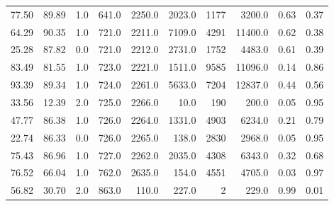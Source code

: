 \begin{table}
\begin{tabular}{rrrrrrrrrr}
77.50 &  89.89 &      1.0 &  641.0 & 2250.0 &  2023.0 &  1177 &  3200.0 & 0.63 & 0.37 \\
64.29 &  90.35 &      1.0 &  721.0 & 2211.0 &  7109.0 &  4291 & 11400.0 & 0.62 & 0.38 \\
25.28 &  87.82 &      0.0 &  721.0 & 2212.0 &  2731.0 &  1752 &  4483.0 & 0.61 & 0.39 \\
83.49 &  81.55 &      1.0 &  723.0 & 2221.0 &  1511.0 &  9585 & 11096.0 & 0.14 & 0.86 \\
93.39 &  89.34 &      1.0 &  724.0 & 2261.0 &  5633.0 &  7204 & 12837.0 & 0.44 & 0.56 \\
33.56 &  12.39 &      2.0 &  725.0 & 2266.0 &    10.0 &   190 &   200.0 & 0.05 & 0.95 \\
47.77 &  86.38 &      1.0 &  726.0 & 2264.0 &  1331.0 &  4903 &  6234.0 & 0.21 & 0.79 \\
22.74 &  86.33 &      0.0 &  726.0 & 2265.0 &   138.0 &  2830 &  2968.0 & 0.05 & 0.95 \\
75.43 &  86.96 &      1.0 &  727.0 & 2262.0 &  2035.0 &  4308 &  6343.0 & 0.32 & 0.68 \\
76.52 &  66.04 &      1.0 &  762.0 & 2635.0 &   154.0 &  4551 &  4705.0 & 0.03 & 0.97 \\
56.82 &  30.70 &      2.0 &  863.0 &  110.0 &   227.0 &     2 &   229.0 & 0.99 & 0.01 \\
\bottomrule
\end{tabular}
\end{table}

